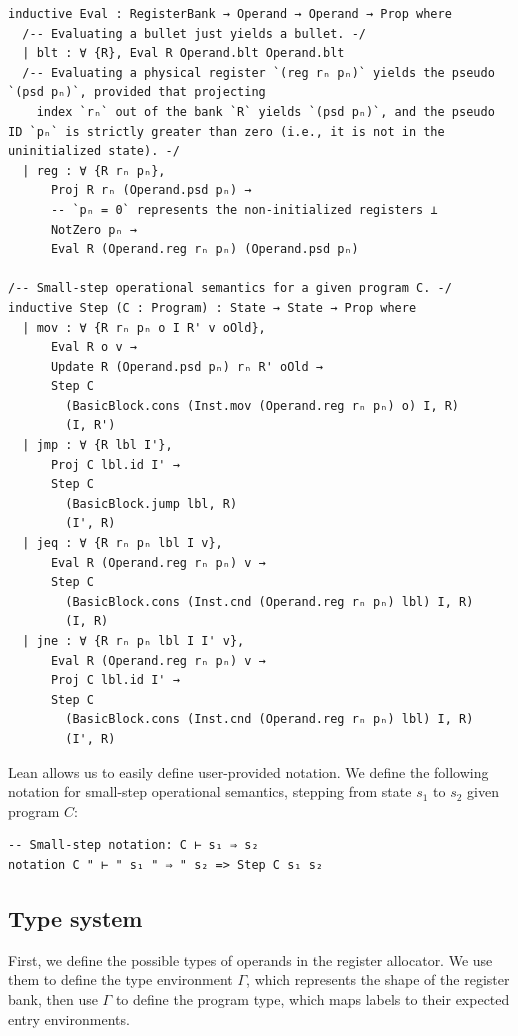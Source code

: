 \documentclass[]{NobArticle}
\begin{document}
\begin{minipage}{\linewidth}
\begin{lstlisting}
inductive Eval : RegisterBank → Operand → Operand → Prop where
  /-- Evaluating a bullet just yields a bullet. -/
  | blt : ∀ {R}, Eval R Operand.blt Operand.blt
  /-- Evaluating a physical register `(reg rₙ pₙ)` yields the pseudo `(psd pₙ)`, provided that projecting
    index `rₙ` out of the bank `R` yields `(psd pₙ)`, and the pseudo ID `pₙ` is strictly greater than zero (i.e., it is not in the uninitialized state). -/
  | reg : ∀ {R rₙ pₙ},
      Proj R rₙ (Operand.psd pₙ) →
      -- `pₙ = 0` represents the non-initialized registers ⊥
      NotZero pₙ →
      Eval R (Operand.reg rₙ pₙ) (Operand.psd pₙ)

/-- Small-step operational semantics for a given program C. -/
inductive Step (C : Program) : State → State → Prop where
  | mov : ∀ {R rₙ pₙ o I R' v oOld},
      Eval R o v →
      Update R (Operand.psd pₙ) rₙ R' oOld →
      Step C
        (BasicBlock.cons (Inst.mov (Operand.reg rₙ pₙ) o) I, R)
        (I, R')
  | jmp : ∀ {R lbl I'},
      Proj C lbl.id I' →
      Step C
        (BasicBlock.jump lbl, R)
        (I', R)
  | jeq : ∀ {R rₙ pₙ lbl I v},
      Eval R (Operand.reg rₙ pₙ) v →
      Step C
        (BasicBlock.cons (Inst.cnd (Operand.reg rₙ pₙ) lbl) I, R)
        (I, R)
  | jne : ∀ {R rₙ pₙ lbl I I' v},
      Eval R (Operand.reg rₙ pₙ) v →
      Proj C lbl.id I' →
      Step C
        (BasicBlock.cons (Inst.cnd (Operand.reg rₙ pₙ) lbl) I, R)
        (I', R)
\end{lstlisting}
\end{minipage}

Lean allows us to easily define user-provided notation. We define the following notation for small-step operational semantics, stepping from state $s_1$ to $s_2$ given program $C$:

\begin{minipage}{\linewidth}
\begin{lstlisting}
-- Small-step notation: C ⊢ s₁ ⇒ s₂
notation C " ⊢ " s₁ " ⇒ " s₂ => Step C s₁ s₂
\end{lstlisting}
\end{minipage}

\subsection{Type system}

First, we define the possible types of operands in the register allocator. We use them to define the type environment $\Gamma$, which represents the shape of the register bank, then use $\Gamma$ to define the program type, which maps labels to their expected entry environments.
\end{document}
